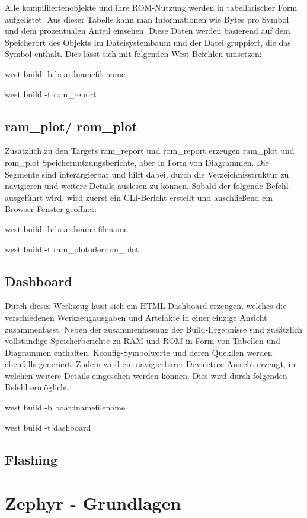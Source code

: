 Alle kompiliiertenobjekte und ihre ROM-Nutzung werden in tabellarischer Form aufgelistet. Aus dieser Tabelle kann man Informationen wie Bytes pro Symbol und dem prozentualen Anteil einsehen. Diese Daten werden basierend auf dem Speicherort des Objekts im Dateisystembaum und der Datei gruppiert, die das Symbol enth{\"a}lt. Dies l{\"a}sst sich mit folgenden West Befehlen umsetzen:

west build -b boardnamefilename

west build -t rom\_report

\subsection{ram\_plot/ rom\_plot}

Zus{\"a}tzlich zu den Targets ram\_report und rom\_report erzeugen ram\_plot und rom\_plot Speichernutzungsberichte, aber in Form von Diagrammen. Die Segmente sind interargierbar und hilft dabei, durch die Verzeichnisstruktur zu navigieren und weitere Details auslesen zu k{\"o}nnen. Sobald der folgende Befehl ausgef{\"u}hrt wird, wird zuerst ein CLI-Bericht erstellt und anschlie{\ss}end ein Browser-Fenster ge{\"o}ffnet:

west build -b boardname filename

west build -t ram\_plotoderrom\_plot

\subsection{Dashboard}

Durch dieses Werkzeug l{\"a}sst sich ein HTML-Dashboard erzeugen, welches die verschiedenen Werkzeugausgaben und Artefakte in einer einzige Ansicht zusammenfasst. Neben der zusammenfassung der Build-Ergebnisse sind zus{\"a}tzlich vollst{\"a}ndige Speicherberichte zu RAM und ROM in Form von Tabellen und Diagrammen enthalten. Kconfig-Symbolwerte und deren Quekllen werden ebenfalls generiert. Zudem wird ein navigierbarer Devicetree-Ansicht erzeugt, in welchen weitere Details eingesehen werden k{\"o}nnen. Dies wird durch folgenden Befehl erm{\"o}glicht:

west build -b boardnamefilename

west build -t dashboard

\subsection{Flashing}

\section{Zephyr - Grundlagen}

